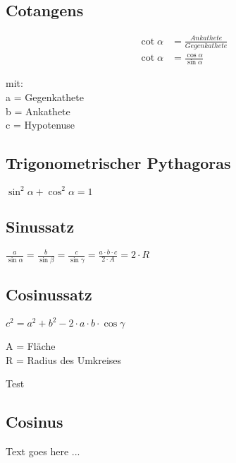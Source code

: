 \documentclass[english]{latex4ei/latex4ei_sheet}
\begin{document}
\begin{sectionbox}
	\subsection{Cotangens}
		\begin{emphbox}
			\begin{align*}
			\cot \alpha &= \frac{Ankathete}{Gegenkathete} \\
			\cot \alpha &= \frac{\cos \alpha}{\sin \alpha} 		
			\end{align*}
		\end{emphbox}
	mit:\\
	a = Gegenkathete\\
	b = Ankathete\\
	c = Hypotenuse


	\subsection{Trigonometrischer Pythagoras}
		\begin{emphbox}
			$ \sin ^2 \alpha + \cos ^2 \alpha = 1 $
		\end{emphbox}
		
	\subsection{Sinussatz}
		\begin{emphbox}
			$ \frac{a}{\sin \alpha} = \frac{b}{\sin \beta} = \frac{c}{\sin \gamma} = \frac{a \cdot b \cdot c}{2 \cdot A} = 2 \cdot R$
		\end{emphbox}

	\subsection{Cosinussatz}
		\begin{emphbox}
			$ c^2 = a^2 + b^2 - 2 \cdot a \cdot b \cdot \cos \gamma$
		\end{emphbox}

\begin{symbolbox}
	A = Fläche\\
	R = Radius des Umkreises
\end{symbolbox}

\begin{bluebox}
	Test
\end{bluebox}


\end{sectionbox}


\begin{sectionbox}
	\subsection{Cosinus}

	Text goes here ...


\end{sectionbox}





\end{document}
